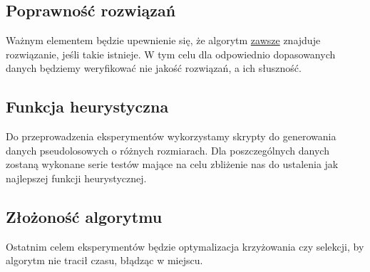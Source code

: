 \documentclass{article}
\begin{document}
\subsection{Poprawność rozwiązań}
Ważnym elementem będzie upewnienie się, że algorytm \underline{zawsze} znajduje rozwiązanie, jeśli takie istnieje. W tym celu dla odpowiednio dopasowanych danych będziemy weryfikować nie jakość rozwiązań, a ich słuszność.
\subsection{Funkcja heurystyczna}
Do przeprowadzenia eksperymentów wykorzystamy skrypty do generowania danych pseudolosowych o różnych rozmiarach. Dla poszczególnych danych zostaną wykonane serie testów mające na celu zbliżenie nas do ustalenia jak najlepszej funkcji heurystycznej.
\subsection{Złożoność algorytmu}
Ostatnim celem eksperymentów będzie optymalizacja krzyżowania czy selekcji, by algorytm nie tracił czasu, błądząc w miejscu.
\end{document}
